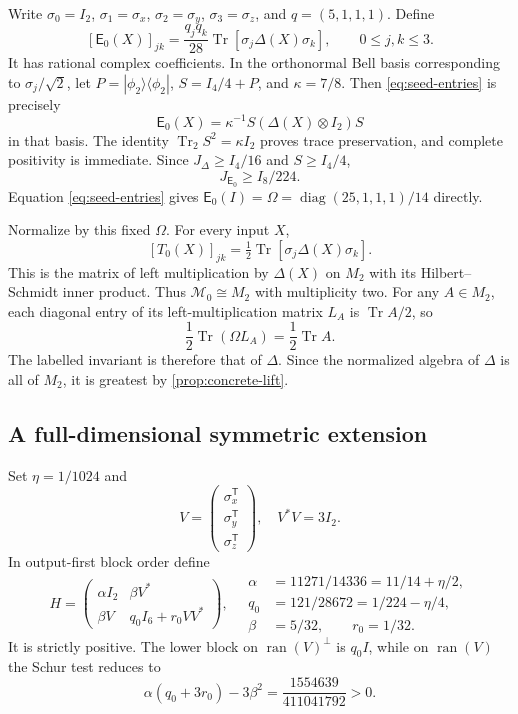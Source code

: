 \documentclass[11pt,reqno]{amsart}
\theoremstyle{definition}
\theoremstyle{remark}
\numberwithin{equation}{section}
\DeclareMathOperator{\Tr}{Tr}
\DeclareMathOperator{\diag}{diag}
\newcommand{\M}{\mathcal M}
\newcommand{\E}{\mathsf E}
\begin{document}
Write $\sigma_0=I_2$, $\sigma_1=\sigma_x$, $\sigma_2=\sigma_y$, $\sigma_3=\sigma_z$, and $q=(5,1,1,1)$. Define
\begin{equation}\label{eq:seed-entries}
 [\E_0(X)]_{jk}=\frac{q_jq_k}{28}
 \Tr[\sigma_j\Delta(X)\sigma_k],\qquad 0\le j,k\le3.
\end{equation}
It has rational complex coefficients. In the orthonormal Bell basis corresponding to $\sigma_j/\sqrt2$, let $P=|\phi_2\rangle\langle\phi_2|$, $S=I_4/4+P$, and $\kappa=7/8$. Then \eqref{eq:seed-entries} is precisely
\[
 \E_0(X)=\kappa^{-1}S(\Delta(X)\otimes I_2)S
\]
in that basis. The identity $\Tr_2S^2=\kappa I_2$ proves trace preservation, and complete positivity is immediate. Since $J_\Delta\ge I_4/16$ and $S\ge I_4/4$,
\begin{equation}\label{eq:seed-floor}
 J_{\E_0}\ge I_8/224.
\end{equation}
Equation \eqref{eq:seed-entries} gives $\E_0(I)=\Omega=\diag(25,1,1,1)/14$ directly.

Normalize by this fixed $\Omega$. For every input $X$,
\[
 [T_0(X)]_{jk}=\tfrac12\Tr[\sigma_j\Delta(X)\sigma_k].
\]
This is the matrix of left multiplication by $\Delta(X)$ on $M_2$ with its Hilbert--Schmidt inner product. Thus $\M_0\cong M_2$ with multiplicity two. For any $A\in M_2$, each diagonal entry of its left-multiplication matrix $L_A$ is $\Tr A/2$, so
\[
 \frac12\Tr(\Omega L_A)=\frac12\Tr A.
\]
The labelled invariant is therefore that of $\Delta$. Since the normalized algebra of $\Delta$ is all of $M_2$, it is greatest by \cref{prop:concrete-lift}.

\subsection{A full-dimensional symmetric extension}

Set $\eta=1/1024$ and
\[
 V=\begin{pmatrix}\sigma_x^{\mathsf T}\\\sigma_y^{\mathsf T}\\\sigma_z^{\mathsf T}\end{pmatrix},
 \quad V^*V=3I_2.
\]
In output-first block order define
\begin{equation}\label{eq:core-H}
 H=\begin{pmatrix}\alpha I_2&\beta V^*\\
 \beta V&q_0I_6+r_0VV^*\end{pmatrix},
 \quad
 \begin{aligned}
 \alpha&=11271/14336=11/14+\eta/2,\\
 q_0&=121/28672=1/224-\eta/4,\\
 \beta&=5/32,\qquad r_0=1/32.
 \end{aligned}
\end{equation}
It is strictly positive. The lower block on $\operatorname{ran}(V)^\perp$ is $q_0I$, while on $\operatorname{ran}(V)$ the Schur test reduces to
\[
 \alpha(q_0+3r_0)-3\beta^2
 =\frac{1554639}{411041792}>0.
\]
\end{document}
